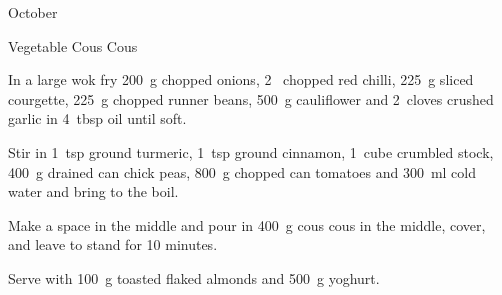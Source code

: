 \begin{menu}{October}
\begin{recipe}{2}{Vegetable Cous Cous}
    \begin{instructions}
    \item 
        In a large wok fry
        200~g chopped onions,
        2~ chopped red chilli,
        225~g sliced courgette,
        225~g chopped runner beans,
        500~g  cauliflower
        and
        2~cloves crushed garlic
        in
        4~tbsp  oil
        until soft.
      \item 
        Stir in
        1~tsp  ground turmeric,
        1~tsp  ground cinnamon,
        1~cube crumbled stock,
        400~g drained can chick peas,
        800~g chopped can tomatoes
        and
        300~ml  cold water
        and bring to the boil.
      \item 
        Make a space in the middle and pour in
        400~g  cous cous
        in the middle, cover,
        and leave to stand for 10 minutes.
      \item 
        Serve with
        100~g toasted flaked almonds
        and
        500~g  yoghurt.
      
    \end{instructions}
    \end{recipe}%
  
    \clearpage
    \end{menu}
	
